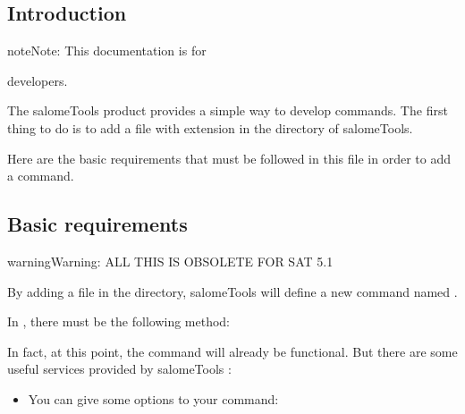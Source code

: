 \documentclass[a4paper,10pt,english]{sphinxmanual}
\begin{document}
\subsection{Introduction}
\label{\detokenize{write_command:introduction}}
\begin{sphinxadmonition}{note}{Note:}
This documentation is for %
\begin{footnote}[22]\sphinxAtStartFootnote
{}
%
\end{footnote} developers.
\end{sphinxadmonition}

The salomeTools product provides a simple way to develop commands.
The first thing to do is to add a file with  extension in the  directory of salomeTools.

Here are the basic requirements that must be followed in this file in order to add a command.


\subsection{Basic requirements}
\label{\detokenize{write_command:basic-requirements}}
\begin{sphinxadmonition}{warning}{Warning:}
ALL THIS IS OBSOLETE FOR SAT 5.1
\end{sphinxadmonition}

By adding a file  in the  directory, salomeTools will define a new command named .

In , there must be the following method:

%
\begin{sphinxVerbatim}[commandchars=\\\{\}]
   
\end{sphinxVerbatim}

In fact, at this point, the command will already be functional.
But there are some useful services provided by salomeTools :
\begin{itemize}
\item {} 
You can give some options to your command:

\end{itemize}
\end{document}
